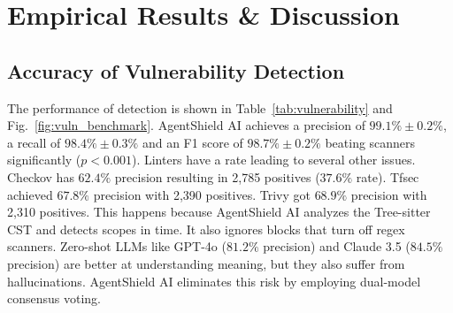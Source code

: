\documentclass[runningheads]{llncs}
\begin{document}
\section{Empirical Results \& Discussion}

\subsection{Accuracy of Vulnerability Detection}
The performance of detection is shown in Table~\ref{tab:vulnerability} and Fig.~\ref{fig:vuln_benchmark}. AgentShield AI achieves a precision of $99.1\% \pm 0.2\%$, a recall of $98.4\% \pm 0.3\%$ and an F1 score of $98.7\% \pm 0.2\%$ beating scanners significantly ($p < 0.001$). Linters have a rate leading to several other issues. Checkov has $62.4\%$ precision resulting in 2,785 positives ($37.6\%$ rate). Tfsec achieved $67.8\%$ precision with 2,390 positives. Trivy got $68.9\%$ precision with 2,310 positives. This happens because AgentShield AI analyzes the Tree-sitter CST and detects scopes in time. It also ignores blocks that turn off regex scanners. Zero-shot LLMs like GPT-4o ($81.2\%$ precision) and Claude 3.5 ($84.5\%$ precision) are better at understanding meaning, but they also suffer from hallucinations. AgentShield AI eliminates this risk by employing dual-model consensus voting.

\begin{table}[t]
\centering
\caption{Vulnerability Detection Benchmark Across 2,450 IaC Templates (Mean $\pm$ 1SD).}
\label{tab:vulnerability}
\setlength{\tabcolsep}{3.5pt}
\end{table}
\end{document}
